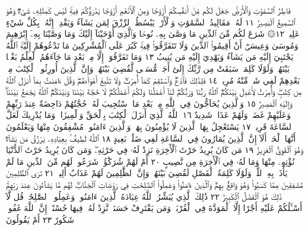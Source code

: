 فَاطِرُ ٱلسَّمَٰوَٰتِ وَٱلْأَرْضِۚ جَعَلَ لَكُم مِّنْ أَنفُسِكُمْ أَزْوَٰجࣰا
وَمِنَ ٱلْأَنْعَٰمِ أَزْوَٰجࣰا يَذْرَؤُكُمْ فِيهِۚ لَيْسَ كَمِثْلِهِۦ شَيْءࣱۖ وَهُوَ
ٱلسَّمِيعُ ٱلْبَصِيرُ ١١ لَهُۥ مَقَالِيدُ ٱلسَّمَٰوَٰتِ وَٱلْأَرْضِۖ يَبْسُطُ
ٱلرِّزْقَ لِمَن يَشَآءُ وَيَقْدِرُۚ إِنَّهُۥ بِكُلِّ شَيْءٍ عَلِيمࣱ ١٢۞ شَرَعَ
لَكُم مِّنَ ٱلدِّينِ مَا وَصَّىٰ بِهِۦ نُوحࣰا وَٱلَّذِيٓ أَوْحَيْنَآ إِلَيْكَ وَمَا
وَصَّيْنَا بِهِۦٓ إِبْرَٰهِيمَ وَمُوسَىٰ وَعِيسَىٰٓۖ أَنْ أَقِيمُوا۟ ٱلدِّينَ
وَلَا تَتَفَرَّقُوا۟ فِيهِۚ كَبُرَ عَلَى ٱلْمُشْرِكِينَ مَا تَدْعُوهُمْ إِلَيْهِۚ ٱللَّهُ
يَجْتَبِيٓ إِلَيْهِ مَن يَشَآءُ وَيَهْدِيٓ إِلَيْهِ مَن يُنِيبُ ١٣ وَمَا تَفَرَّقُوٓا۟
إِلَّا مِنۢ بَعْدِ مَا جَآءَهُمُ ٱلْعِلْمُ بَغْيَۢا بَيْنَهُمْۚ وَلَوْلَا كَلِمَةࣱ سَبَقَتْ
مِن رَّبِّكَ إِلَىٰٓ أَجَلࣲ مُّسَمࣰّى لَّقُضِيَ بَيْنَهُمْۚ وَإِنَّ ٱلَّذِينَ أُورِثُوا۟
ٱلْكِتَٰبَ مِنۢ بَعْدِهِمْ لَفِي شَكࣲّ مِّنْهُ مُرِيبࣲ ١٤ فَلِذَٰلِكَ
فَٱدْعُۖ وَٱسْتَقِمْ كَمَآ أُمِرْتَۖ وَلَا تَتَّبِعْ أَهْوَآءَهُمْۖ وَقُلْ
ءَامَنتُ بِمَآ أَنزَلَ ٱللَّهُ مِن كِتَٰبࣲۖ وَأُمِرْتُ لِأَعْدِلَ بَيْنَكُمُۖ
ٱللَّهُ رَبُّنَا وَرَبُّكُمْۖ لَنَآ أَعْمَٰلُنَا وَلَكُمْ أَعْمَٰلُكُمْۖ لَا حُجَّةَ
بَيْنَنَا وَبَيْنَكُمُۖ ٱللَّهُ يَجْمَعُ بَيْنَنَاۖ وَإِلَيْهِ ٱلْمَصِيرُ ١٥
وَٱلَّذِينَ يُحَآجُّونَ فِي ٱللَّهِ مِنۢ بَعْدِ مَا ٱسْتُجِيبَ لَهُۥ حُجَّتُهُمْ
دَاحِضَةٌ عِندَ رَبِّهِمْ وَعَلَيْهِمْ غَضَبࣱ وَلَهُمْ عَذَابࣱ شَدِيدٌ ١٦
ٱللَّهُ ٱلَّذِيٓ أَنزَلَ ٱلْكِتَٰبَ بِٱلْحَقِّ وَٱلْمِيزَانَۗ وَمَا يُدْرِيكَ
لَعَلَّ ٱلسَّاعَةَ قَرِيبࣱ ١٧ يَسْتَعْجِلُ بِهَا ٱلَّذِينَ لَا يُؤْمِنُونَ
بِهَاۖ وَٱلَّذِينَ ءَامَنُوا۟ مُشْفِقُونَ مِنْهَا وَيَعْلَمُونَ أَنَّهَا ٱلْحَقُّۗ
أَلَآ إِنَّ ٱلَّذِينَ يُمَارُونَ فِي ٱلسَّاعَةِ لَفِي ضَلَٰلِۭ بَعِيدٍ ١٨
ٱللَّهُ لَطِيفُۢ بِعِبَادِهِۦ يَرْزُقُ مَن يَشَآءُۖ وَهُوَ ٱلْقَوِيُّ ٱلْعَزِيزُ ١٩
مَن كَانَ يُرِيدُ حَرْثَ ٱلْأٓخِرَةِ نَزِدْ لَهُۥ فِي حَرْثِهِۦۖ وَمَن
كَانَ يُرِيدُ حَرْثَ ٱلدُّنْيَا نُؤْتِهِۦ مِنْهَا وَمَا لَهُۥ فِي ٱلْأٓخِرَةِ
مِن نَّصِيبٍ ٢٠ أَمْ لَهُمْ شُرَكَٰٓؤُا۟ شَرَعُوا۟ لَهُم مِّنَ ٱلدِّينِ
مَا لَمْ يَأْذَنۢ بِهِ ٱللَّهُۚ وَلَوْلَا كَلِمَةُ ٱلْفَصْلِ لَقُضِيَ بَيْنَهُمْۗ
وَإِنَّ ٱلظَّٰلِمِينَ لَهُمْ عَذَابٌ أَلِيمࣱ ٢١ تَرَى ٱلظَّٰلِمِينَ
مُشْفِقِينَ مِمَّا كَسَبُوا۟ وَهُوَ وَاقِعُۢ بِهِمْۗ وَٱلَّذِينَ
ءَامَنُوا۟ وَعَمِلُوا۟ ٱلصَّٰلِحَٰتِ فِي رَوْضَاتِ ٱلْجَنَّاتِۖ لَهُم
مَّا يَشَآءُونَ عِندَ رَبِّهِمْۚ ذَٰلِكَ هُوَ ٱلْفَضْلُ ٱلْكَبِيرُ ٢٢
ذَٰلِكَ ٱلَّذِي يُبَشِّرُ ٱللَّهُ عِبَادَهُ ٱلَّذِينَ ءَامَنُوا۟ وَعَمِلُوا۟ ٱلصَّٰلِحَٰتِۗ
قُل لَّآ أَسْـَٔلُكُمْ عَلَيْهِ أَجْرًا إِلَّا ٱلْمَوَدَّةَ فِي ٱلْقُرْبَىٰۗ وَمَن يَقْتَرِفْ
حَسَنَةࣰ نَّزِدْ لَهُۥ فِيهَا حُسْنًاۚ إِنَّ ٱللَّهَ غَفُورࣱ شَكُورٌ ٢٣ أَمْ يَقُولُونَ
